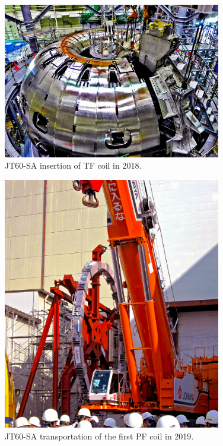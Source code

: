 \begin{figure}
	\centering
	\includegraphics[width=0.85\textwidth]{AppCont/image4.jpg}
	\caption{ JT60-SA  insertion of TF coil in 2018.\label{figure4}}
\end{figure}
\begin{figure}
	\centering
	\includegraphics[width=0.85\textwidth]{AppCont/image3.jpg}
	\caption{ JT60-SA transportation of the first PF coil in 2019.\label{figure3}}
\end{figure}
